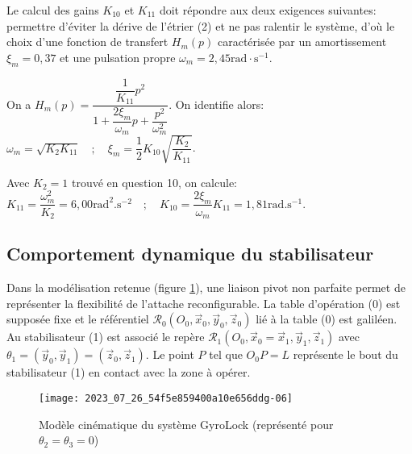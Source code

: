 Le calcul des gains $K_{10}$ et $K_{11}$ doit répondre aux deux exigences suivantes: permettre d'éviter la dérive de l'étrier (2) et ne pas ralentir le système, d'où le choix d'une fonction de transfert $H_{m}(p)$ caractérisée par un amortissement $\xi_{m}=0,37$ et une pulsation propre $\omega_{m}=2,45 \mathrm{rad} \cdot \mathrm{s}^{-1}$.

\ifprof
\begin{corrige}
On a $H_{m}(p) = \dfrac{\dfrac{1}{K_{11}}p^2}{1 + \dfrac{2\xi_m}{\omega_m}p + \dfrac{p^2}{\omega_m^2}}$. On identifie alors:
$ \omega_m = \sqrt{K_2 K_{11}} \quad ; \quad \xi_m = \dfrac{1}{2}K_{10}\sqrt{\dfrac{K_{2}}{K_{11}}} $.

Avec $K_2 = 1$ trouvé en question 10, on calcule:
$ \boxed{K_{11} = \dfrac{\omega_m^2}{K_2} = 6,00\text{rad}^2.\text{s}^{-2}} \quad ; \quad \boxed{K_{10} = \dfrac{2\xi_m}{\omega_m}K_{11} = 1,81\text{rad}.\text{s}^{-1}} $.
\end{corrige}
\else
\fi


\subsection{\label{sec:II.C} Comportement dynamique du stabilisateur}



Dans la modélisation retenue (figure \ref{fig_ccspsi2022:09}), une liaison pivot non parfaite permet de représenter la flexibilité de l'attache reconfigurable. La table d'opération (0) est supposée fixe et le référentiel $\mathcal{R}_{0}\left(O_{0}, \vec{x}_{0}, \vec{y}_{0}, \vec{z}_{0}\right)$ lié à la table (0) est galiléen. Au stabilisateur (1) est associé le repère $\mathcal{R}_{1}\left(O_{0}, \vec{x}_{0}=\vec{x}_{1}, \vec{y}_{1}, \vec{z}_{1}\right)$ avec $\theta_{1}=\left(\vec{y}_{0}, \vec{y}_{1}\right)=\left(\vec{z}_{0}, \vec{z}_{1}\right)$. Le point $P$ tel que $O_{0} P=L$ représente le bout du stabilisateur (1) en contact avec la zone à opérer.

\begin{figure}[!h]
\centering
\texttt{[image: 2023\_07\_26\_54f5e859400a10e656ddg-06]}
\caption{\label{fig_ccspsi2022:09}Modèle cinématique du système GyroLock (représenté pour $\theta_{2}=\theta_{3}=0$)}
\end{figure}

